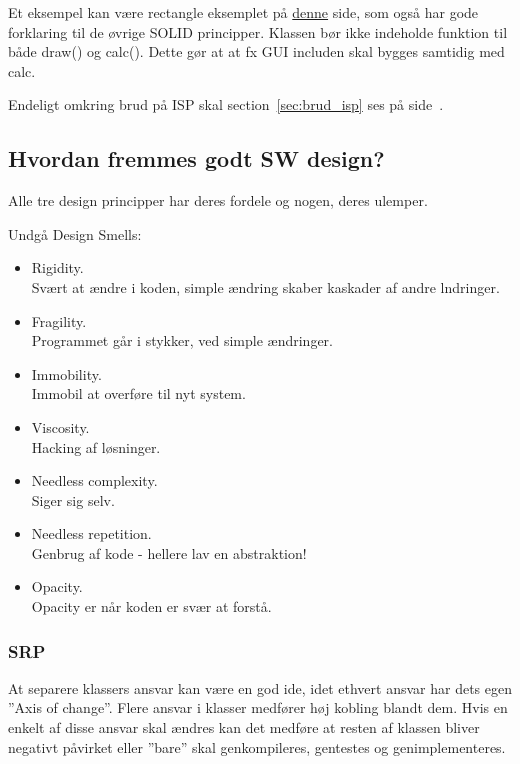Et eksempel kan være rectangle eksemplet på  \href{http://code.tutsplus.com/tutorials/solid-part-3-liskov-substitution-interface-segregation-principles--net-36710}{denne} side, som også har gode forklaring til de øvrige SOLID principper. Klassen bør ikke indeholde funktion til både draw() og calc(). Dette gør at at fx GUI includen skal bygges samtidig med calc.

Endeligt omkring brud på ISP skal section~\ref{sec:brud_isp} ses på side~\pageref{sec:brud_isp}.



\subsection{Hvordan fremmes godt SW design?}
Alle tre design principper har deres fordele og nogen, deres ulemper.

Undgå Design Smells:

\begin{itemize}
	\item Rigidity.\\
	Svært at ændre i koden, simple ændring skaber kaskader af andre lndringer.
	\item Fragility.\\
	Programmet går i stykker, ved simple ændringer.
	\item Immobility. \\
	Immobil at overføre til nyt system.
	\item Viscosity.\\
	Hacking af løsninger.
	\item Needless complexity.\\
	Siger sig selv.
	\item Needless repetition.\\
	Genbrug af kode - hellere lav en abstraktion!
	\item Opacity.\\
	Opacity er når koden er svær at forstå.
\end{itemize}

\subsubsection{SRP}
At separere klassers ansvar kan være en god ide, idet ethvert ansvar har dets egen ''Axis of change''. Flere ansvar i klasser medfører høj kobling blandt dem. Hvis en enkelt af disse ansvar skal ændres kan det medføre at resten af klassen bliver negativt påvirket eller ''bare'' skal genkompileres, gentestes og genimplementeres.\\

